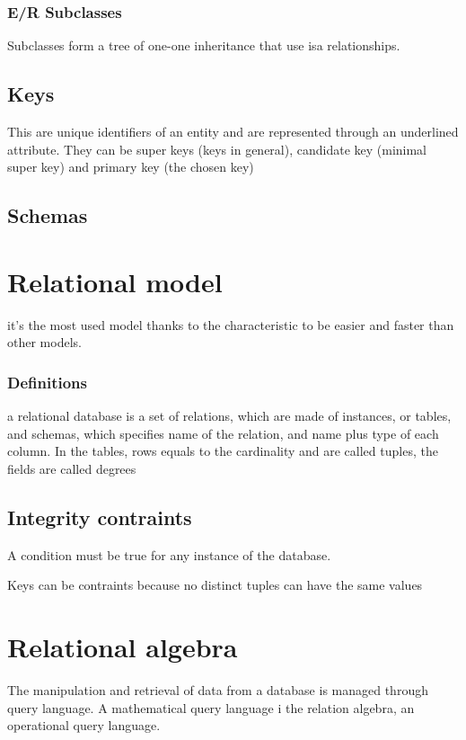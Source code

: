 \documentclass[12pt, a4paper]{article}
\begin{document}
\subsubsection*{E/R Subclasses}
Subclasses form a tree of one-one inheritance that use isa relationships. 

\subsection{Keys}
This are unique identifiers of an entity and are represented through an underlined attribute. They can
be super keys (keys in general), candidate key (minimal super key) and primary key (the chosen key)

\subsection{Schemas}

\newpage
\section{Relational model}
it's the most used model thanks to the characteristic to be easier and faster than other models.

\subsubsection*{Definitions}
a relational database is a set of relations, which are made of instances, or tables, and schemas, which specifies name 
of the relation, and name plus type of each column. In the tables, rows equals to the cardinality and are called tuples,
the fields are called degrees

\subsection{Integrity contraints}
A condition must be true for any instance of the database.

Keys can be contraints because no distinct tuples can have the same values 

\newpage
\section{Relational algebra}
The manipulation and retrieval of data from a database is managed through query language. A mathematical query language
i the relation algebra, an operational query language.
\end{document}
